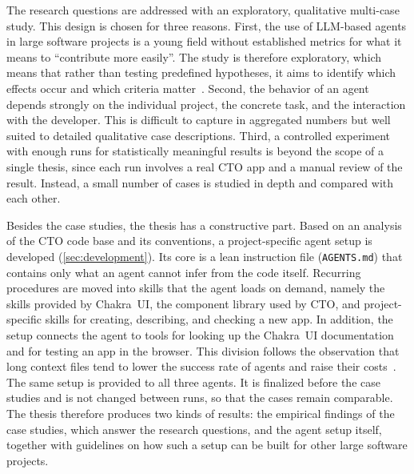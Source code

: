 The research questions are addressed with an exploratory, qualitative multi-case study. This design is chosen for three reasons. First, the use of \ac{LLM}-based agents in large software projects is a young field without established metrics for what it means to \enquote{contribute more easily}. The study is therefore exploratory, which means that rather than testing predefined hypotheses, it aims to identify which effects occur and which criteria matter~\cite{Runeson2009GuidelinesFC}. Second, the behavior of an agent depends strongly on the individual project, the concrete task, and the interaction with the developer. This is difficult to capture in aggregated numbers but well suited to detailed qualitative case descriptions. Third, a controlled experiment with enough runs for statistically meaningful results is beyond the scope of a single thesis, since each run involves a real \ac{CTO} app and a manual review of the result. Instead, a small number of cases is studied in depth and compared with each other.

Besides the case studies, the thesis has a constructive part. Based on an analysis of the \ac{CTO} code base and its conventions, a project-specific agent setup is developed (\cref{sec:development}). Its core is a lean instruction file (\texttt{AGENTS.md}) that contains only what an agent cannot infer from the code itself. Recurring procedures are moved into skills that the agent loads on demand, namely the skills provided by Chakra~UI, the component library used by \ac{CTO}, and project-specific skills for creating, describing, and checking a new app. In addition, the setup connects the agent to tools for looking up the Chakra~UI documentation and for testing an app in the browser. This division follows the observation that long context files tend to lower the success rate of agents and raise their costs~\cite{Gloaguen2026EvaluatingAA}. The same setup is provided to all three agents. It is finalized before the case studies and is not changed between runs, so that the cases remain comparable. The thesis therefore produces two kinds of results: the empirical findings of the case studies, which answer the research questions, and the agent setup itself, together with guidelines on how such a setup can be built for other large software projects.

